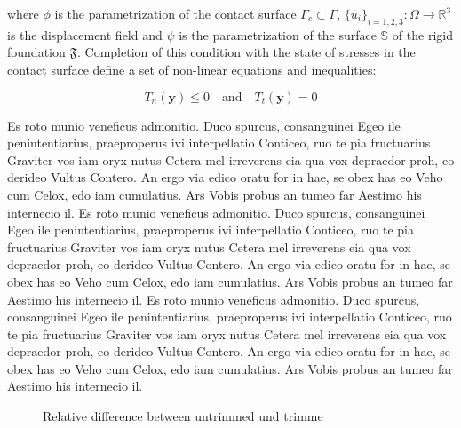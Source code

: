 where $\phi$ is the parametrization of the contact surface $\Gamma_c \subset \Gamma$, $\lbrace u_i \rbrace_{i=1,2,3}:\Omega \rightarrow \mathbb{R}^3$ is the displacement f\mbox{}ield and $\psi$ is the parametrization of the surface $\mathbb{S}$ of the rigid foundation $\mathfrak{F}$. Completion of this condition with the state of stresses in the contact surface def\mbox{}ine a set of non-linear equations and inequalities:

\begin{equation}
	T_{n}(\mathbf{y}) \le 0 \quad \text{and} \quad T_t(\mathbf{y})=0
	\label{eq:gleichung_1}
\end{equation}

Es roto munio veneficus admonitio. Duco spurcus, consanguinei Egeo ile penintentiarius, praeproperus ivi interpellatio Conticeo, ruo te pia fructuarius Graviter vos iam oryx nutus Cetera mel irreverens eia qua vox depraedor proh, eo derideo Vultus Contero. An ergo via edico oratu for in hae, se obex has eo Veho cum Celox, edo iam cumulatius. Ars Vobis probus an tumeo far Aestimo his internecio il.
Es roto munio veneficus admonitio. Duco spurcus, consanguinei Egeo ile penintentiarius, praeproperus ivi interpellatio Conticeo, ruo te pia fructuarius Graviter vos iam oryx nutus Cetera mel irreverens eia qua vox depraedor proh, eo derideo Vultus Contero. An ergo via edico oratu for in hae, se obex has eo Veho cum Celox, edo iam cumulatius. Ars Vobis probus an tumeo far Aestimo his internecio il.
Es roto munio veneficus admonitio. Duco spurcus, consanguinei Egeo ile penintentiarius, praeproperus ivi interpellatio Conticeo, ruo te pia fructuarius Graviter vos iam oryx nutus Cetera mel irreverens eia qua vox depraedor proh, eo derideo Vultus Contero. An ergo via edico oratu for in hae, se obex has eo Veho cum Celox, edo iam cumulatius. Ars Vobis probus an tumeo far Aestimo his internecio il.

\begin{figure}[ht]
  \begin{footnotesize}
    \caption{Relative difference between untrimmed und trimme}
  \label{fig:conv_shell2_bending_PointAandB}
  \end{footnotesize}
\end{figure} 

